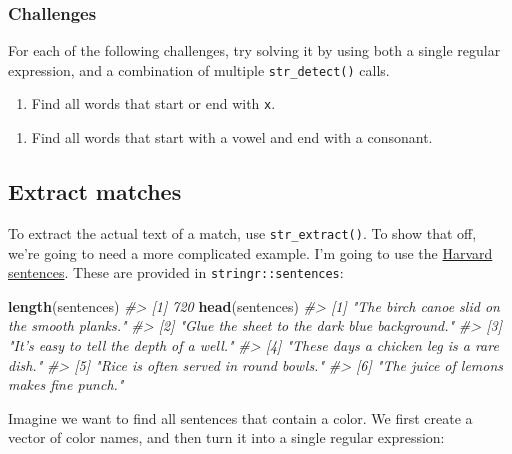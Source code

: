 \documentclass[]{book}
\newenvironment{Shaded}{\begin{snugshade}}{\end{snugshade}}
\newcommand{\CommentTok}[1]{\textcolor[rgb]{0.56,0.35,0.01}{\textit{#1}}}
\newcommand{\KeywordTok}[1]{\textcolor[rgb]{0.13,0.29,0.53}{\textbf{#1}}}
\newcommand{\NormalTok}[1]{#1}
\providecommand{\tightlist}{%
  \setlength{\itemsep}{0pt}\setlength{\parskip}{0pt}}
\begin{document}
\hypertarget{challenges-17}{%
\subsubsection*{Challenges}\label{challenges-17}}

For each of the following challenges, try solving it by using both a single regular expression, and a combination of multiple \texttt{str\_detect()} calls.

\begin{enumerate}
\def\labelenumi{\arabic{enumi}.}
\tightlist
\item
  Find all words that start or end with \texttt{x}.
\end{enumerate}

\begin{enumerate}
\def\labelenumi{\arabic{enumi}.}
\setcounter{enumi}{1}
\tightlist
\item
  Find all words that start with a vowel and end with a consonant.
\end{enumerate}

\hypertarget{extract-matches}{%
\subsection{Extract matches}\label{extract-matches}}

To extract the actual text of a match, use \texttt{str\_extract()}. To show that off, we're going to need a more complicated example. I'm going to use the \href{https://en.wikipedia.org/wiki/Harvard_sentences}{Harvard sentences}. These are provided in \texttt{stringr::sentences}:

\begin{Shaded}
\begin{Highlighting}[]
\KeywordTok{length}\NormalTok{(sentences)}
\CommentTok{#> [1] 720}
\KeywordTok{head}\NormalTok{(sentences)}
\CommentTok{#> [1] "The birch canoe slid on the smooth planks." }
\CommentTok{#> [2] "Glue the sheet to the dark blue background."}
\CommentTok{#> [3] "It's easy to tell the depth of a well."     }
\CommentTok{#> [4] "These days a chicken leg is a rare dish."   }
\CommentTok{#> [5] "Rice is often served in round bowls."       }
\CommentTok{#> [6] "The juice of lemons makes fine punch."}
\end{Highlighting}
\end{Shaded}

Imagine we want to find all sentences that contain a color. We first create a vector of color names, and then turn it into a single regular expression:
\end{document}
